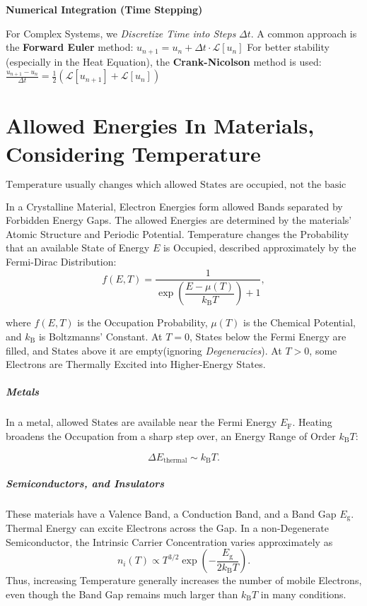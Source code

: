 \documentclass[a4paper, 10pt, onepage]{elegantbook}
\begin{document}
{    \textbf{Numerical Integration (Time Stepping)}  

For Complex Systems, we \emph{Discretize Time into Steps} $\Delta t$. A common approach is the \textbf{Forward Euler} 
method:
$u_{n+1} = u_n + \Delta t \cdot \mathcal{L}[u_n]$
For better stability (especially in the Heat Equation), the \textbf{Crank-Nicolson} method is used:
$\frac{u_{n+1} - u_n}{\Delta t} = \frac{1}{2} \left( \mathcal{L}[u_{n+1}] + \mathcal{L}[u_n] \right) $


\chapter{Allowed Energies In Materials, Considering Temperature}

\[
\boxed{\text{Temperature usually changes which allowed States are occupied,
not the basic rule that determines which States are allowed.}}
\]

In a Crystalline Material, Electron Energies form allowed Bands separated by Forbidden Energy Gaps. The allowed 
Energies are determined by the materials' Atomic Structure and Periodic Potential. Temperature changes the Probability 
that an available State of Energy \(E\) is Occupied, described approximately by the Fermi-Dirac Distribution:
\[
f(E,T)=\frac{1}{\exp\!\left(\dfrac{E-\mu(T)}{k_{\mathrm B}T}\right)+1},
\]

where \(f(E,T)\) is the Occupation Probability, \(\mu(T)\) is the Chemical Potential, and \(k_{\mathrm B}\) is 
Boltzmanns' Constant. At \(T=0\), States below the Fermi Energy are filled, and States above it are empty(ignoring 
\emph{Degeneracies}). At \(T>0\), some Electrons are Thermally Excited
into Higher-Energy States.

\paragraph{Metals}

In a metal, allowed States are available near the Fermi Energy \(E_{\mathrm F}\). Heating broadens the Occupation from 
a sharp step over, an Energy Range of
Order \(k_{\mathrm B}T\):

\[
\Delta E_{\mathrm{thermal}}\sim k_{\mathrm B}T.
\]

\paragraph{Semiconductors, and Insulators}

These materials have a Valence Band, a Conduction Band, and a Band Gap \(E_{\mathrm g}\). Thermal Energy can excite 
Electrons across the Gap. In a non-Degenerate Semiconductor, the Intrinsic Carrier Concentration varies approximately as
\[
n_i(T)\propto T^{3/2}
\exp\!\left(-\frac{E_{\mathrm g}}{2k_{\mathrm B}T}\right).
\]
Thus, increasing Temperature generally increases the number of mobile
Electrons, even though the Band Gap remains much larger than \(k_{\mathrm B}T\) in many conditions.

}
\end{document}
